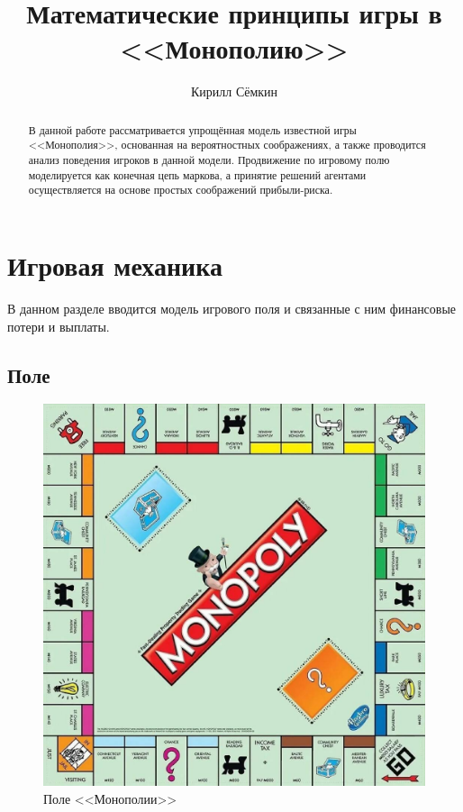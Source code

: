 
\usepackage{subfigure}
\usepackage{ulem}

\title{Математические принципы игры в <<Монополию>>}
\author{Кирилл Сёмкин}
\date{}


	\maketitle
	
	\begin{abstract}
		В данной работе рассматривается упрощённая модель известной игры <<Монополия>>, основанная на вероятностных соображениях, а также проводится анализ поведения игроков в данной модели. Продвижение по игровому полю моделируется как конечная цепь маркова, а принятие решений агентами осуществляется на основе простых соображений прибыли-риска.
	\end{abstract}
	
	
	\section{Игровая механика}
	
	В данном разделе вводится модель игрового поля и связанные с ним финансовые потери и выплаты.
	
	\subsection*{Поле}
	
	\begin{figure}[h]
		\begin{center}
			\includegraphics[width=0.6\linewidth, keepaspectratio]{img/momopoly_field}
		\end{center}
		\caption{Поле <<Монополии>>}
	\end{figure}

